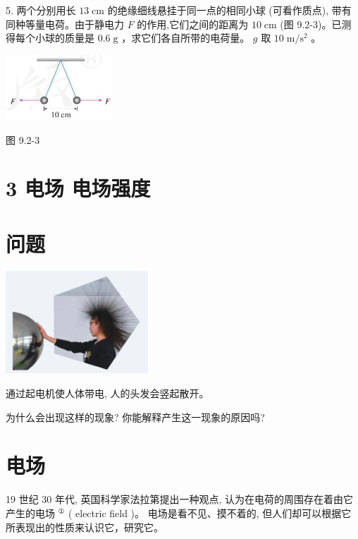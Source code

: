 \documentclass[10pt]{article}
\begin{document}
5. 两个分别用长 \({13}\mathrm{\;{cm}}\) 的绝缘细线悬挂于同一点的相同小球 (可看作质点), 带有同种等量电荷。由于静电力 \(F\) 的作用,它们之间的距离为 \({10}\mathrm{\;{cm}}\) (图 9.2-3)。已测得每个小球的质量是 \({0.6}\mathrm{\;g}\) ，求它们各自所带的电荷量。 \(g\) 取 \({10}\mathrm{\;m}/{\mathrm{s}}^{2}\) 。

\begin{center}
\includegraphics[max width=0.3\textwidth]{images/01911d5f-8e38-70c0-b5b8-2b399bd115b6_15_994346.jpg}
\end{center}

图 9.2-3

\section*{3 电场 电场强度}

\section*{问题}

\begin{center}
\includegraphics[max width=0.4\textwidth]{images/01911d5f-8e38-70c0-b5b8-2b399bd115b6_16_531437.jpg}
\end{center}

通过起电机使人体带电, 人的头发会竖起散开。

为什么会出现这样的现象? 你能解释产生这一现象的原因吗?

\section*{电场}

19 世纪 30 年代, 英国科学家法拉第提出一种观点, 认为在电荷的周围存在着由它产生的电场 \({}^{\text{①}}\) ( electric field )。 电场是看不见、摸不着的, 但人们却可以根据它所表现出的性质来认识它，研究它。
\end{document}
